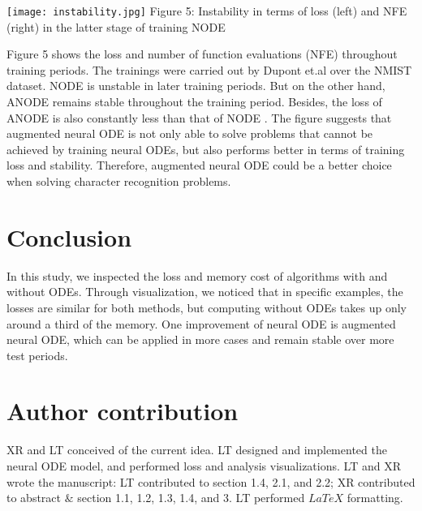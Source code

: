 \documentclass{article}
\begin{document}
\begin{center}
    \texttt{[image: instability.jpg]}
    Figure 5: Instability in terms of loss (left) and NFE (right) in the latter stage of training NODE
\end{center}   

Figure 5 shows the loss and number of function evaluations (NFE) throughout training periods. The trainings were carried out by Dupont et.al over the NMIST dataset. \cite{NMIST} NODE is unstable in later training periods. But on the other hand, ANODE remains stable throughout the training period. Besides, the loss of ANODE is also constantly less than that of NODE \cite{dupont2019augmented}. The figure suggests that augmented neural ODE is not only able to solve problems that cannot be achieved by training neural ODEs, but also performs better in terms of training loss and stability. Therefore, augmented neural ODE could be a better choice when solving character recognition problems.

\section{Conclusion}
In this study, we inspected the loss and memory cost of algorithms with and without ODEs. Through visualization, we noticed that in specific examples, the losses are similar for both methods, but computing without ODEs takes up only around a third of the memory. One improvement of neural ODE is augmented neural ODE, which can be applied in more cases and remain stable over more test periods.

\section{Author contribution}
XR and LT conceived of the current idea. LT designed and implemented the neural ODE model, and performed loss and analysis visualizations. LT and XR wrote the manuscript: LT contributed to section 1.4, 2.1, and 2.2; XR contributed to abstract $\&$ section 1.1, 1.2, 1.3, 1.4, and 3. LT performed   $LaTeX$ formatting.

\printbibliography
\end{document}
